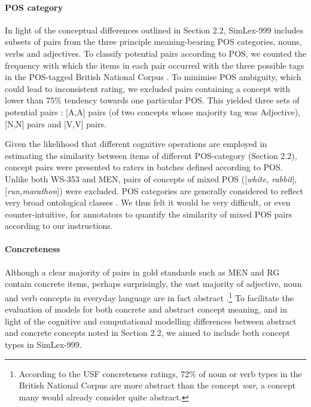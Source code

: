 \documentclass[fullname]{clv2}
\begin{document}
\paragraph{POS category} In light of the conceptual differences outlined in Section 2.2, SimLex-999 includes subsets of pairs from the three principle meaning-bearing POS categories, nouns, verbs and adjectives. To classify potential pairs according to POS, we counted the frequency with which the items in each pair occurred with the three possible tags in the  POS-tagged British National Corpus \cite{leech1994claws4}. To minimise POS ambiguity, which could lead to inconsistent rating, we excluded pairs containing a concept with lower than 75\% tendency towards one particular POS. This yielded three sets of potential pairs : [A,A] pairs (of two concepts whose majority tag was Adjective), [N,N] pairs and [V,V] pairs. 

Given the likelihood that different cognitive operations are employed in estimating the similarity between items of different POS-category (Section 2.2), concept pairs were presented to raters in batches defined according to POS. Unlike both WS-353 and MEN, pairs of concepts of mixed POS ([\emph{white, rabbit}], [\emph{run,marathon}]) were excluded. POS categories are generally considered to reflect very broad ontological classes \cite{fellbaum1999wordnet}. We thus felt it would be very difficult, or even counter-intuitive, for annotators to quantify the similarity of mixed POS pairs according to our instructions. 

\paragraph{Concreteness} Although a clear majority of pairs in gold standards such as MEN and RG contain concrete items, perhaps surprisingly, the vast majority of adjective, noun and verb concepts in everyday language are in fact abstract \cite{hill2014multi,kielaimproving}.\footnote{According to the USF concreteness ratings, 72\% of noun or verb types in the British National Corpus are more abstract than the concept \emph{war}, a concept many would already consider quite abstract.} To facilitate the evaluation of models for both concrete and abstract concept meaning, and in light of the cognitive and computational modelling differences  between abstract and concrete concepts noted in Section 2.2, we aimed to include both concept types in SimLex-999. 
\end{document}
